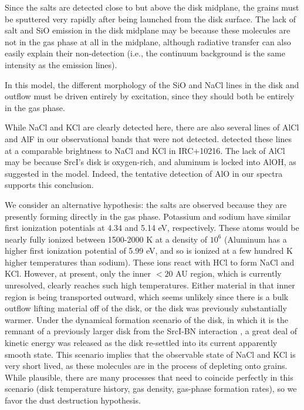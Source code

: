 \documentclass[twocolumn]{aastex62}
\newcommand{\sourcei}{SrcI\xspace}
\begin{document}
Since the salts are detected close to but above the disk midplane, the
grains must be sputtered very rapidly after being launched from the disk surface.
The lack of salt and SiO emission in the disk midplane may be because these
molecules are not in the gas phase at all in the midplane, although radiative
transfer can also easily explain their non-detection (i.e., the continuum
background is the same intensity as the emission lines).


In this model, the different morphology of the SiO and NaCl lines in the disk
and outflow must be driven entirely by excitation, since they should both be
entirely in the gas phase.  

While NaCl and KCl are clearly detected here, there are also several lines of
AlCl and AlF in our observational bands that were not detected.
\citet{Cernicharo1987a} detected these lines at a comparable brightness to NaCl
and KCl in IRC+10216.  The lack of AlCl may be because \sourcei's disk is
oxygen-rich, and aluminum is locked into AlOH, as suggested in the
\citet{Cherncheff2012a} model.  Indeed, the tentative detection of AlO
in our spectra supports this conclusion.


We consider an alternative hypothesis: the salts are observed because they are
presently forming directly in the gas phase.  Potassium and sodium have similar
first ionization potentials at 4.34 and 5.14 eV, respectively.  These atoms
would be nearly fully ionized between 1500-2000 K at a density of $10^6$
\percc (Aluminum has a higher first ionization potential of 5.99 eV, and so is ionized
at a few hundred K higher temperatures than sodium).  These ions react with HCl
to form NaCl and KCl.  However, at present, only the inner $<20$ AU region,
which is currently unresolved, clearly reaches
such high temperatures.  Either material in that inner region is being
transported outward, which seems unlikely since there is a bulk outflow lifting
material off of the disk, or the disk was previously substantially warmer.
Under the dynamical formation scenario of the disk, in which it is the remnant
of a previously larger disk from the \sourcei-BN interaction
\citep{Bally2017a,Luhman2018a}, a great deal of kinetic energy was released as
the disk re-settled into its current apparently smooth state.  This scenario
implies that the observable state of NaCl and KCl is very short lived, as these
molecules are in the process of depleting onto grains.
While plausible, there are many processes that need to coincide perfectly
in this scenario (disk temperature history, gas density, gas-phase formation
rates), so we favor the dust destruction hypothesis.
\end{document}
